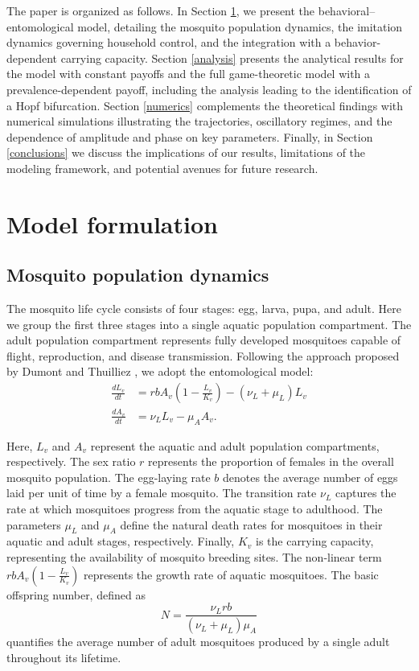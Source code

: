 \documentclass{article}
\theoremstyle{remark}
\theoremstyle{custom} %
\begin{document}
The paper is organized as follows. In Section \ref{model}, we present the behavioral–entomological model, detailing the mosquito population dynamics,  the imitation dynamics governing household control,  and the integration with a behavior-dependent carrying capacity. Section \ref{analysis} presents the analytical results for the model with constant payoffs and the full game-theoretic model with a prevalence-dependent payoff, including the analysis leading to the identification of a Hopf bifurcation. Section \ref{numerics} complements the theoretical findings with numerical simulations illustrating the trajectories, oscillatory regimes, and the dependence of amplitude and phase on key parameters. Finally,  in Section \ref{conclusions} we discuss the implications of our results, limitations of the modeling framework, and potential avenues for future research.



\section{Model formulation} 
\label{model}


\subsection{Mosquito population dynamics}


The mosquito life cycle consists of four stages: egg, larva, pupa, and adult. Here we group the first three stages into a single aquatic population compartment. The adult population compartment represents fully developed mosquitoes capable of flight, reproduction, and disease transmission.  Following the approach proposed by  Dumont and Thuilliez  \cite{dumont_mosquito_control},  we adopt the entomological model:
\begin{equation}
\begin{aligned}
   \frac{dL_v}{dt} &  = r b A_v \left(1 - \frac{L_v}{K_v}\right) - (\nu_L + \mu_L) L_v \\
     \frac{dA_v}{dt} & = \nu_L L_v - \mu_A A_v.
\end{aligned}
  \label{Eq:entomological_model}
\end{equation}


Here, $L_v$  and $A_v$ represent the aquatic and adult population compartments, respectively. The sex ratio $r$ represents the proportion of females in the overall mosquito population. The egg-laying rate $b$ denotes the average number of eggs laid per unit of time by a female mosquito. The transition rate $\nu_L$ captures the rate at which mosquitoes progress from the aquatic stage to adulthood.  The parameters  $\mu_L$ and $\mu_A$ define the natural death rates for mosquitoes in their aquatic and adult stages, respectively. Finally, $K_v$ is the carrying capacity, representing the availability of mosquito breeding sites. The non-linear term \(rbA_v\left(1 - \frac{L_v}{K_v} \right) \) represents the growth rate of aquatic mosquitoes. The basic offspring number, defined as
$$N = \frac{\nu_L r b}{(\nu_L + \mu_L)\mu_A}$$
quantifies the average number of adult mosquitoes produced by a single adult throughout its lifetime.
 
\end{document}
